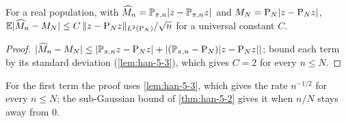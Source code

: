 \begin{proposition}
  \label{prop:han-5-1}
  For a real population, with $\widehat M_n=\mathbb{P}_{\pi,n}|z-\mathbb{P}_{\pi,n} z|$ and $M_N=\mathrm{P}_N|z-\mathrm{P}_N z|$,
  $\mathbb{E}|\widehat M_n-M_N|\le C\,\|z-\mathrm{P}_N z\|_{L^2(\mathrm{P}_N)}/\sqrt n$ for a universal constant $C$.
\end{proposition}
\begin{proof}
  $|\widehat M_n-M_N|\le|\mathbb{P}_{\pi,n} z-\mathrm{P}_N z|+|(\mathbb{P}_{\pi,n}-\mathrm{P}_N)|z-\mathrm{P}_N z||$; bound each term by its standard deviation (\cref{lem:han-5-3}), which gives $C=2$ for every $n\le N$.
\end{proof}
\begin{remark}
  For the first term the proof uses \cref{lem:han-5-3}, which gives the rate $n^{-1/2}$ for every $n\le N$; the sub-Gaussian bound of \cref{thm:han-5-2} gives it when $n/N$ stays away from $0$.
\end{remark}
